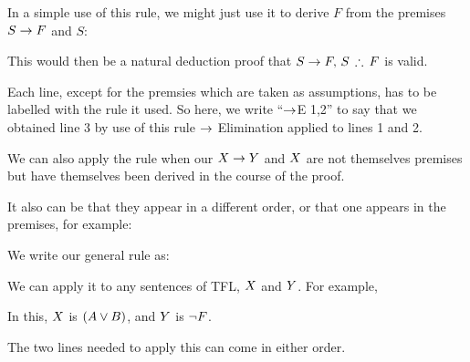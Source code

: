 In a simple use of this rule, we might just use it to derive $F$ from the premises $S\rightarrow F$ and $S$:
\begin{fitchproof}
	 
\end{fitchproof}
This would then be a natural deduction proof that
$S\eif F,\, S\,\therefore \, F$ is valid.

Each line, except for the premsies which are taken as assumptions, has to be labelled with the rule it used. So here, we write ``$\rightarrow$E 1,2'' to say that we obtained line 3 by use of this rule $\rightarrow$ Elimination applied to lines 1 and 2.

We can also apply the rule when our $X\rightarrow Y$ and $X$ are not themselves premises but have themselves been derived in the course of the proof.

\begin{fitchproof}
	 
\end{fitchproof}

It also can be that they appear in a different order, or that one appears in the premises, for example:
\begin{fitchproof}
	\ellipsesline
	\ellipsesline
	 
\end{fitchproof}

We write our general rule as:
\begin{highlighted}
\begin{fitchproof}
	\ellipsesline
	\ellipsesline
	\ellipsesline
	 
\end{fitchproof}\end{highlighted}

We can apply it to any sentences of TFL, $X$ and $Y$.
For example,
\begin{fitchproof}
	 
\end{fitchproof}
In this, $X$ is $(A\vee B)$, and $Y$ is $\neg F$.

The two lines needed to apply this can come in either order. 

